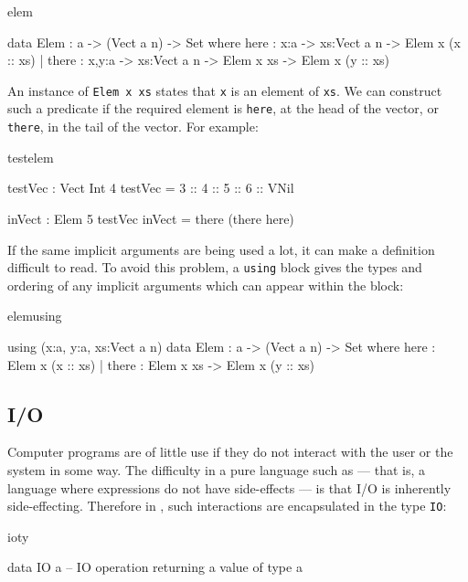 \begin{SaveVerbatim}{elem}

data Elem : a -> (Vect a n) -> Set where
   here :  {x:a} ->   {xs:Vect a n} -> Elem x (x :: xs)
 | there : {x,y:a} -> {xs:Vect a n} -> Elem x xs -> Elem x (y :: xs)

\end{SaveVerbatim}

\noindent
An instance of \texttt{Elem x xs} states that \texttt{x} is an element of 
\texttt{xs}. We can construct
such a predicate if the required element is \texttt{here}, at the head of the vector, 
or \texttt{there}, in the tail of the vector. For example:

\begin{SaveVerbatim}{testelem}

testVec : Vect Int 4
testVec = 3 :: 4 :: 5 :: 6 :: VNil

inVect : Elem 5 testVec
inVect = there (there here)

\end{SaveVerbatim}

\noindent
If the same implicit arguments are being used a lot, it can make a definition
difficult to read. To avoid this problem, a \texttt{using} block gives the types and
ordering of any implicit arguments which can appear within the block:

\begin{SaveVerbatim}{elemusing}

using (x:a, y:a, xs:Vect a n) {
  data Elem : a -> (Vect a n) -> Set where
     here  : Elem x (x :: xs)
   | there : Elem x xs -> Elem x (y :: xs)
}

\end{SaveVerbatim}

\subsection{I/O}

Computer programs are of little use if they do not interact with the user or
the system in some way. The difficulty in a pure language such as \Idris{} ---
that is, a language where expressions do not have side-effects --- is that I/O
is inherently side-effecting. Therefore in \Idris{}, such interactions are
encapsulated in the type \texttt{IO}:

\begin{SaveVerbatim}{ioty}

data IO a -- IO operation returning a value of type a

\end{SaveVerbatim}

